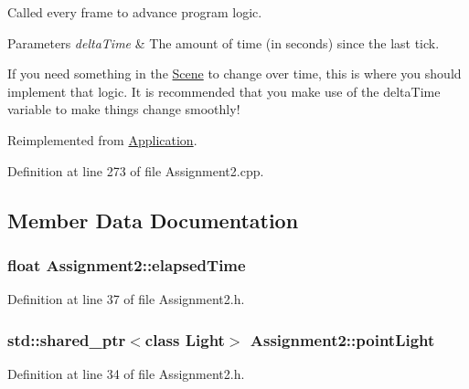 Called every frame to advance program logic. 


\begin{DoxyParams}{Parameters}
{\em delta\+Time} & The amount of time (in seconds) since the last tick.\\
\hline
\end{DoxyParams}
If you need something in the \hyperlink{class_scene}{Scene} to change over time, this is where you should implement that logic. It is recommended that you make use of the delta\+Time variable to make things change smoothly! 

Reimplemented from \hyperlink{class_application_a0800afd5651153d31fa775a8048d14dd}{Application}.



Definition at line 273 of file Assignment2.\+cpp.



\subsection{Member Data Documentation}
\hypertarget{class_assignment2_a1406a4603687f934feca8cf72a850bd5}{}
\subsubsection[{elapsed\+Time}]{\setlength{\rightskip}{0pt plus 5cm}float Assignment2\+::elapsed\+Time\hspace{0.3cm}{\ttfamily [private]}}\label{class_assignment2_a1406a4603687f934feca8cf72a850bd5}


Definition at line 37 of file Assignment2.\+h.

\hypertarget{class_assignment2_abaf6127e0de097717673c0d9b04f8c79}{}
\subsubsection[{point\+Light}]{\setlength{\rightskip}{0pt plus 5cm}std\+::shared\+\_\+ptr$<$class {\bf Light}$>$ Assignment2\+::point\+Light\hspace{0.3cm}{\ttfamily [private]}}\label{class_assignment2_abaf6127e0de097717673c0d9b04f8c79}


Definition at line 34 of file Assignment2.\+h.

\hypertarget{class_assignment2_adad4306da57243fada86a48e4edd7063}{}
